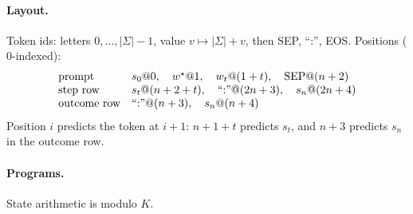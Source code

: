 \paragraph{Layout.} Token ids: letters $0,\ldots,|\Sigma|-1$, value $v\mapsto|\Sigma|+v$, then SEP, ``:'', EOS. Positions ($0$-indexed):
\[
\begin{array}{ll}
 \text{prompt} & s_0@0,\quad w^\star@1,\quad w_t@(1+t),\quad \mathrm{SEP}@(n+2)\\
 \text{step row} & s_t@(n+2+t),\quad ``{:}"@(2n+3),\quad s_n@(2n+4)\\
 \text{outcome row} & ``{:}"@(n+3),\quad s_n@(n+4)
\end{array}
\]
Position $i$ predicts the token at $i+1$: $n+1+t$ predicts $s_t$, and $n+3$ predicts $s_n$ in the outcome row.

\paragraph{Programs.} State arithmetic is modulo $K$.
\begin{center}\small
{}
\end{center}

